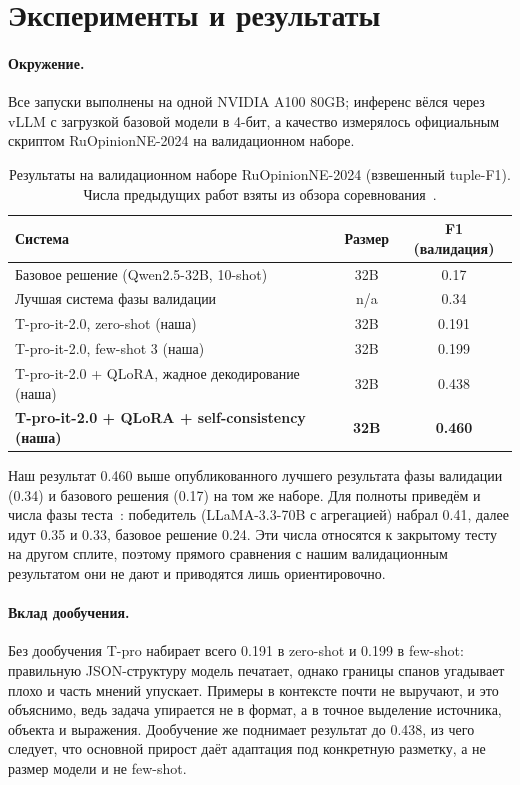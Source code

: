\documentclass[11pt]{article}
\begin{document}
\section{Эксперименты и результаты}
\paragraph{Окружение.}
Все запуски выполнены на одной NVIDIA A100 80GB; инференс вёлся через vLLM с загрузкой базовой модели в 4-бит,
а качество измерялось официальным скриптом RuOpinionNE-2024 на валидационном наборе.

\begin{table}[h]
\centering
\caption{Результаты на валидационном наборе RuOpinionNE-2024 (взвешенный tuple-F1).
Числа предыдущих работ взяты из обзора соревнования~\cite{ruopinionne2024}.}
\label{tab:main}
\begin{tabular}{lcc}
\toprule
Система & Размер & F1 (валидация) \\
\midrule
Базовое решение (Qwen2.5-32B, 10-shot)~\cite{ruopinionne2024} & 32B & 0.17 \\
Лучшая система фазы валидации~\cite{ruopinionne2024} & n/a & 0.34 \\
\midrule
T-pro-it-2.0, zero-shot (наша) & 32B & 0.191 \\
T-pro-it-2.0, few-shot 3 (наша) & 32B & 0.199 \\
T-pro-it-2.0 + QLoRA, жадное декодирование (наша) & 32B & 0.438 \\
\textbf{T-pro-it-2.0 + QLoRA + self-consistency (наша)} & \textbf{32B} & \textbf{0.460} \\
\bottomrule
\end{tabular}
\end{table}

\noindent
Наш результат 0.460 выше опубликованного лучшего результата фазы валидации (0.34) и базового решения (0.17)
на том же наборе. Для полноты приведём и числа фазы теста~\cite{ruopinionne2024}: победитель (LLaMA-3.3-70B с
агрегацией) набрал 0.41, далее идут 0.35 и 0.33, базовое решение 0.24. Эти числа относятся к закрытому тесту на
другом сплите, поэтому прямого сравнения с нашим валидационным результатом они не дают и приводятся лишь
ориентировочно.

\paragraph{Вклад дообучения.}
Без дообучения T-pro набирает всего 0.191 в zero-shot и 0.199 в few-shot: правильную JSON-структуру модель печатает,
однако границы спанов угадывает плохо и часть мнений упускает. Примеры в контексте почти не выручают, и это
объяснимо, ведь задача упирается не в формат, а в точное выделение источника, объекта и выражения. Дообучение же
поднимает результат до 0.438, из чего следует, что основной прирост даёт адаптация под конкретную разметку, а не
размер модели и не few-shot.
\end{document}
